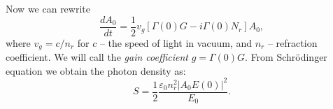 Now we can rewrite
\begin{equation}
	\frac{d A_0}{d t} = \frac{1}{2} v_g [\Gamma(0) G - i \Gamma(0) N_r]A_0,
\end{equation}
where $v_g = c/n_r$ for $c$ -- the speed of light in vacuum, and $n_{r}$ -- refraction coefficient. We will call the \textit{gain coefficient} $g = \Gamma(0)G$.
From Schr\"odinger equation we obtain the photon density as:
\begin{equation*}
	S = \frac{1}{2} \frac{\varepsilon_0 n_r^2 |A_0 E(0)|^2}{E_0}.
\end{equation*}